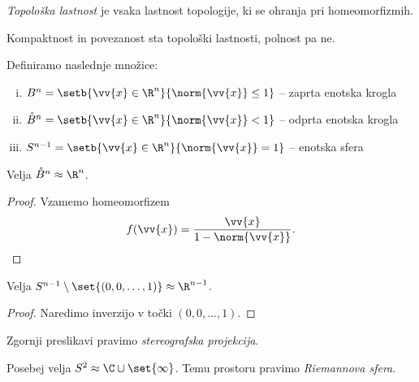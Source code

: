 \obvs

\begin{definicija}
\emph{Topološka lastnost} je vsaka
lastnost topologije, ki se ohranja pri homeomorfizmih.
\end{definicija}

\begin{opomba}
Kompaktnost in povezanost sta topološki lastnosti, polnost pa ne.
\end{opomba}

\begin{definicija}
Definiramo naslednje množice:

\begin{enumerate}[i)]
\item $B^n = \setb{\vv{x} \in \R^n}{\norm{\vv{x}} \leq 1}$
-- zaprta enotska krogla
\item $\mathring{B}^n = \setb{\vv{x} \in \R^n}{\norm{\vv{x}} < 1}$
-- odprta enotska krogla
\item $S^{n-1} = \setb{\vv{x} \in \R^n}{\norm{\vv{x}} = 1}$
-- enotska sfera
\end{enumerate}
\end{definicija}

\begin{trditev}
Velja $\mathring{B}^n \approx \R^n$.
\end{trditev}

\begin{proof}
Vzamemo homeomorfizem
\[
f(\vv{x}) = \frac{\vv{x}}{1 - \norm{\vv{x}}}. \qedhere
\]
\end{proof}

\begin{trditev}
Velja $S^{n-1} \setminus \set{(0,0,\dots,1)} \approx \R^{n-1}$.
\end{trditev}

\begin{proof}
Naredimo inverzijo v točki $(0,0,\dots,1)$.
\end{proof}

\begin{opomba}
Zgornji preslikavi pravimo
\emph{stereografska projekcija}.
\end{opomba}

\begin{opomba}
Posebej velja $S^2 \approx \C \cup \set{\infty}$. Temu prostoru
pravimo
\emph{Riemannova sfera}.
\end{opomba}

